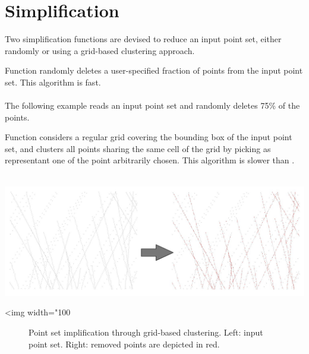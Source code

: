 \section{Simplification}

Two simplification functions are devised to reduce an input point set, either randomly or using a grid-based clustering approach.

Function  randomly deletes a user-specified fraction of points from the input point set. This algorithm is fast. \\
  \\

The following example reads an input point set and randomly deletes 75\% of the points.

Function  considers a regular grid covering the bounding box of the input point set, and clusters all points sharing the same cell of the grid by picking as representant one of the point arbitrarily chosen. This algorithm is slower than . \\
  \\

\begin{center}
    \label{Point_set_processing_3-fig-grid_simplification}
    \begin{ccTexOnly}
        \includegraphics[width=1.0\textwidth]{Point_set_processing_3/grid_simplification} %
    \end{ccTexOnly}
    \begin{ccHtmlOnly}
        <img width="100%
    \end{ccHtmlOnly}
    \begin{figure}[h]
        \caption{Point set implification through grid-based clustering.
                 Left: input point set.
                 Right: removed points are depicted in red.}
    \end{figure}
\end{center}



